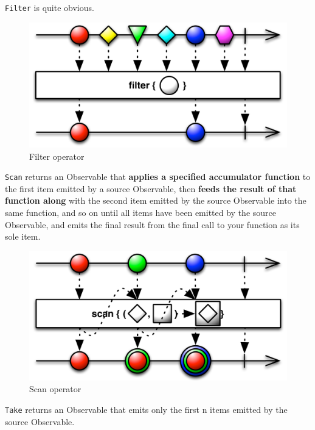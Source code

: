 \label{filter}

\texttt{Filter} is quite obvious.

\begin{figure}[htbp]
\centering
\includegraphics[scale=0.5]{imgs/filter.png}
\caption{Filter operator}
\end{figure}

\label{scan}

\texttt{Scan} returns an Observable that \textbf{applies a specified
accumulator function} to the first item emitted by a source Observable,
then \textbf{feeds the result of that function along} with the second
item emitted by the source Observable into the same function, and so on
until all items have been emitted by the source Observable, and emits
the final result from the final call to your function as its sole item.

\begin{figure}[htbp]
\centering
\includegraphics[scale=0.5]{imgs/scan.png}
\caption{Scan operator}
\end{figure}

\label{take}

\texttt{Take} returns an Observable that emits only the first n items
emitted by the source Observable.

